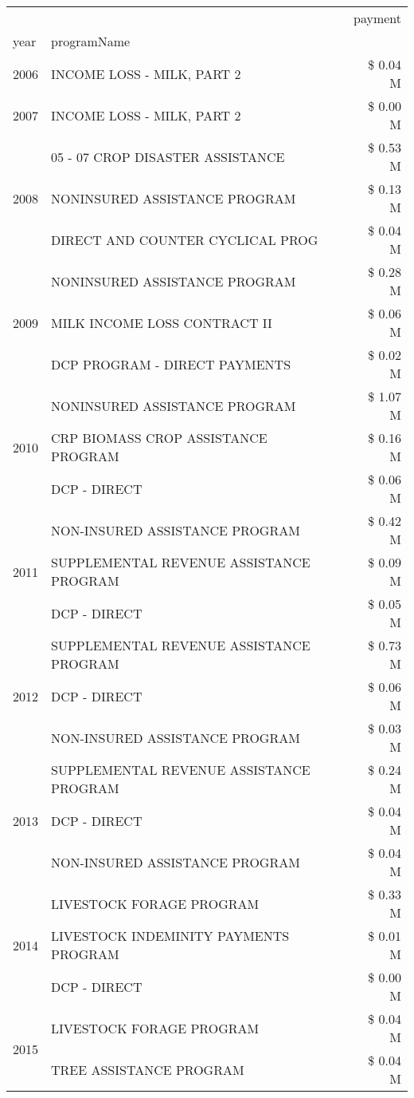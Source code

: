 \begin{tabular}{llr}
\toprule
 &  & payment \\
year & programName &  \\
\midrule
2006 & INCOME LOSS - MILK, PART 2 & \$ 0.04 M \\
\cline{1-3}
2007 & INCOME LOSS - MILK, PART 2 & \$ 0.00 M \\
\cline{1-3}
\multirow[t]{3}{*}{2008} & 05 - 07 CROP DISASTER ASSISTANCE & \$ 0.53 M \\
 & NONINSURED ASSISTANCE PROGRAM & \$ 0.13 M \\
 & DIRECT AND COUNTER CYCLICAL PROG & \$ 0.04 M \\
\cline{1-3}
\multirow[t]{3}{*}{2009} & NONINSURED ASSISTANCE PROGRAM & \$ 0.28 M \\
 & MILK INCOME LOSS CONTRACT II & \$ 0.06 M \\
 & DCP PROGRAM - DIRECT PAYMENTS & \$ 0.02 M \\
\cline{1-3}
\multirow[t]{3}{*}{2010} & NONINSURED ASSISTANCE PROGRAM & \$ 1.07 M \\
 & CRP BIOMASS CROP ASSISTANCE PROGRAM & \$ 0.16 M \\
 & DCP - DIRECT & \$ 0.06 M \\
\cline{1-3}
\multirow[t]{3}{*}{2011} & NON-INSURED ASSISTANCE PROGRAM & \$ 0.42 M \\
 & SUPPLEMENTAL REVENUE ASSISTANCE PROGRAM & \$ 0.09 M \\
 & DCP - DIRECT & \$ 0.05 M \\
\cline{1-3}
\multirow[t]{3}{*}{2012} & SUPPLEMENTAL REVENUE ASSISTANCE PROGRAM & \$ 0.73 M \\
 & DCP - DIRECT & \$ 0.06 M \\
 & NON-INSURED ASSISTANCE PROGRAM & \$ 0.03 M \\
\cline{1-3}
\multirow[t]{3}{*}{2013} & SUPPLEMENTAL REVENUE ASSISTANCE PROGRAM & \$ 0.24 M \\
 & DCP - DIRECT & \$ 0.04 M \\
 & NON-INSURED ASSISTANCE PROGRAM & \$ 0.04 M \\
\cline{1-3}
\multirow[t]{3}{*}{2014} & LIVESTOCK FORAGE PROGRAM & \$ 0.33 M \\
 & LIVESTOCK INDEMINITY PAYMENTS PROGRAM & \$ 0.01 M \\
 & DCP - DIRECT & \$ 0.00 M \\
\cline{1-3}
\multirow[t]{3}{*}{2015} & LIVESTOCK FORAGE PROGRAM & \$ 0.04 M \\
 & TREE ASSISTANCE PROGRAM & \$ 0.04 M \\

\end{tabular}
